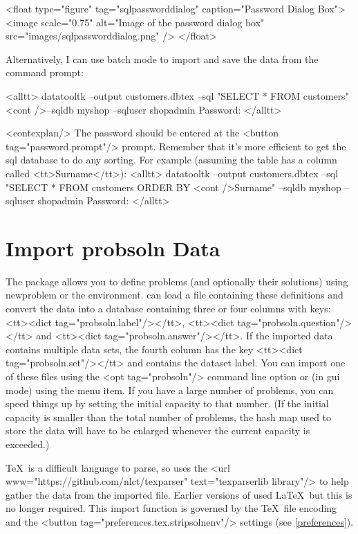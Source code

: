      <float type="figure" tag="sqlpassworddialog" caption="Password Dialog Box">
      <image scale="0.75" alt="Image of the password dialog box" src="images/sqlpassworddialog.png" />
     </float>

   Alternatively, I can use batch mode to import and save the data 
   from the command prompt:

   <alltt>
datatooltk --output customers.dbtex --sql "SELECT * FROM customers" <cont />--sqldb myshop --sqluser shopadmin
Password:
   </alltt>

   <contexplan/> The password should be entered at the <button tag="password.prompt"/>
   prompt. Remember that it's more efficient to get the \gls{sql}
   database to do any sorting. For example (assuming the table has 
   a column called <tt>Surname</tt>):
   <alltt>
datatooltk --output customers.dbtex --sql "SELECT * FROM customers ORDER BY <cont />Surname" --sqldb myshop --sqluser shopadmin
Password:
   </alltt>


\section{Import probsoln Data}\label{importprobsoln}

   The  package allows you to define problems (and 
   optionally their solutions) using \gls{newproblem} or the
    environment.  can load a file
   containing these definitions and convert the  data
   into a  database containing three or four columns
   with keys: <tt><dict tag="probsoln.label"/></tt>, 
   <tt><dict tag="probsoln.question"/></tt> and
   <tt><dict tag="probsoln.answer"/></tt>. If the imported data contains
   multiple  data sets, the fourth column has the
   key <tt><dict tag="probsoln.set"/></tt> and contains the dataset label. 
   You can import one of these
   files using the <opt tag="probsoln"/> command line option or (in
   \gls{gui} mode) using the 
   menu item. If you have a large number of problems, you can speed things
   up by setting the initial capacity to that number. (If the initial
   capacity is smaller than the total number of problems, the hash map
   used to store the data will have to be enlarged whenever the current
   capacity is exceeded.)


   \TeX\ is a difficult language to parse, so  uses the
   <url www="https://github.com/nlct/texparser"
   text="texparserlib library"/> to help gather the data from the imported 
   file. Earlier versions of  used \LaTeX\ but this is no longer 
   required. This import function is governed by the \TeX\ file encoding
   and the <button tag="preferences.tex.stripsolnenv"/> settings 
   (see \autoref{preferences}).


